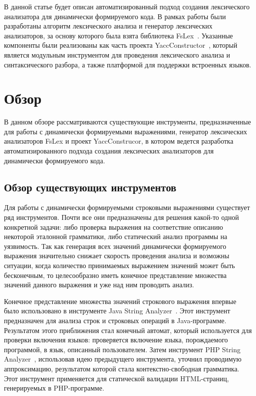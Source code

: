 \documentclass[10pt, conference, compsocconf]{IEEEtran}
\begin{document}
В данной статье будет описан автоматизированный подход создания лексического анализатора для динамически формируемого кода. В рамках работы были разработаны алгоритм лексического анализа и генератор лексических анализаторов,  за основу которого была взята библиотека FsLex~\cite{FsLex}. Указанные компоненты были реализованы как часть проекта  YaccConstructor~\cite{YC_article}, который является модульным инструментом для проведения лексического анализа и синтаксического разбора, а также платформой для поддержки встроенных языков.


\section{Обзор}

В данном обзоре рассматриваются существующие инструменты, предназначенные для работы с динамически формируемыми выражениями, генератор лексических анализаторов FsLex и проект YaccConstrucor, в котором ведется разработка автоматизированного подхода создания лексических анализаторов для динамически формируемого кода. 


\subsection{Обзор существующих инструментов}

Для работы с динамически формируемыми строковыми выражениями существует ряд инструментов. Почти все они предназначены для решения какой-то одной конкретной задачи: либо проверка выражения на соответствие описанию некоторой эталонной грамматики,  либо статический анализ программы на уязвимость. Так как генерация всех значений динамически формируемого выражения значительно снижает скорость проведения анализа и возможны ситуации, когда количество принимаемых выражением значений может быть бесконечным, то  целесообразно иметь конечное представление множества значений данного выражения и уже над ним проводить анализ. 

Конечное представление множества значений строкового выражения впервые было использовано в инструменте Java String Analyzer~\cite{JSA}. Этот инструмент предназначен для анализа строк и строковых операций в Java-программе. Результатом этого приближения стал конечный автомат, который используется для проверки включения языков: проверяется включение языка, порождаемого программой, в язык, описанный пользователем. Затем инструмент PHP String Analyzer~\cite{PHPSA}, использовав идею предыдущего инструмента, уточнил проводимую аппроксимацию, результатом которой стала контекстно-свободная грамматика. Этот инструмент применяется для статической валидации HTML-страниц, генерируемых в PHP-программе. 
\end{document}

